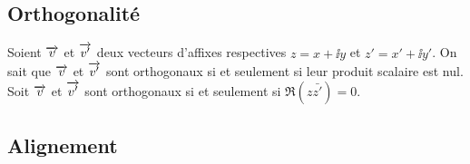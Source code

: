                                 \subsection{Orthogonalité}
                                \label{subsec:complexeorthogonalite}

                                Soient \(\overrightarrow{v}\) et \(\overrightarrow{v'}\) deux vecteurs d'affixes respectives \(z = x 
                                + \ii y\) et \(z' = x' + \ii y'\). On sait que \(\overrightarrow{v}\) et \(\overrightarrow{v'}\) 
                                sont orthogonaux si et seulement si leur produit scalaire est nul. Soit 
                                \(\overrightarrow{v}\) et \(\overrightarrow{v'}\) sont orthogonaux si et seulement si \(\Re(z 
                                \bar{z'}) = 0\).

                                \subsection{Alignement}
                                \label{subsec:complexealignement}


